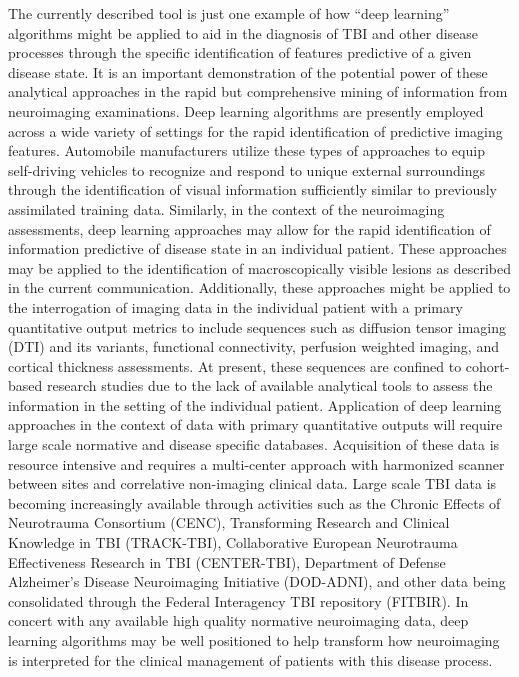\documentclass[11pt,]{article}
\begin{document}
The currently described tool is just one example of how ``deep
learning'' algorithms might be applied to aid in the diagnosis of TBI
and other disease processes through the specific identification of
features predictive of a given disease state. It is an important
demonstration of the potential power of these analytical approaches in
the rapid but comprehensive mining of information from neuroimaging
examinations. Deep learning algorithms are presently employed across a
wide variety of settings for the rapid identification of predictive
imaging features. Automobile manufacturers utilize these types of
approaches to equip self-driving vehicles to recognize and respond to
unique external surroundings through the identification of visual
information sufficiently similar to previously assimilated training
data. Similarly, in the context of the neuroimaging assessments, deep
learning approaches may allow for the rapid identification of
information predictive of disease state in an individual patient. These
approaches may be applied to the identification of macroscopically
visible lesions as described in the current communication. Additionally,
these approaches might be applied to the interrogation of imaging data
in the individual patient with a primary quantitative output metrics to
include sequences such as diffusion tensor imaging (DTI) and its
variants, functional connectivity, perfusion weighted imaging, and
cortical thickness assessments. At present, these sequences are confined
to cohort-based research studies due to the lack of available analytical
tools to assess the information in the setting of the individual
patient. Application of deep learning approaches in the context of data
with primary quantitative outputs will require large scale normative and
disease specific databases. Acquisition of these data is resource
intensive and requires a multi-center approach with harmonized scanner
between sites and correlative non-imaging clinical data. Large scale TBI
data is becoming increasingly available through activities such as the
Chronic Effects of Neurotrauma Consortium (CENC), Transforming Research
and Clinical Knowledge in TBI (TRACK-TBI), Collaborative European
Neurotrauma Effectiveness Research in TBI (CENTER-TBI), Department of
Defense Alzheimer's Disease Neuroimaging Initiative (DOD-ADNI), and
other data being consolidated through the Federal Interagency TBI
repository (FITBIR). In concert with any available high quality
normative neuroimaging data, deep learning algorithms may be well
positioned to help transform how neuroimaging is interpreted for the
clinical management of patients with this disease process.
\end{document}

